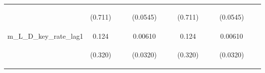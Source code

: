 \documentclass[]{article}
\begin{document}
\begin{center}
\begin{tabular}{lcccccccccccc}
\vspace{4pt} & \begin{footnotesize}(0.711)\end{footnotesize} & \begin{footnotesize}\end{footnotesize} & \begin{footnotesize}\end{footnotesize} & \begin{footnotesize}(0.0545)\end{footnotesize} & \begin{footnotesize}\end{footnotesize} & \begin{footnotesize}\end{footnotesize} & \begin{footnotesize}(0.711)\end{footnotesize} & \begin{footnotesize}\end{footnotesize} & \begin{footnotesize}\end{footnotesize} & \begin{footnotesize}(0.0545)\end{footnotesize} & \begin{footnotesize}\end{footnotesize} & \begin{footnotesize}\end{footnotesize} \\
m\_L\_D\_key\_rate\_lag1 & 0.124 &  &  & 0.00610 &  &  & 0.124 &  &  & 0.00610 &  &  \\
\vspace{4pt} & \begin{footnotesize}(0.320)\end{footnotesize} & \begin{footnotesize}\end{footnotesize} & \begin{footnotesize}\end{footnotesize} & \begin{footnotesize}(0.0320)\end{footnotesize} & \begin{footnotesize}\end{footnotesize} & \begin{footnotesize}\end{footnotesize} & \begin{footnotesize}(0.320)\end{footnotesize} & \begin{footnotesize}\end{footnotesize} & \begin{footnotesize}\end{footnotesize} & \begin{footnotesize}(0.0320)\end{footnotesize} & \begin{footnotesize}\end{footnotesize} & \begin{footnotesize}\end{footnotesize} \\

\end{tabular}
\end{center}
\end{document}
